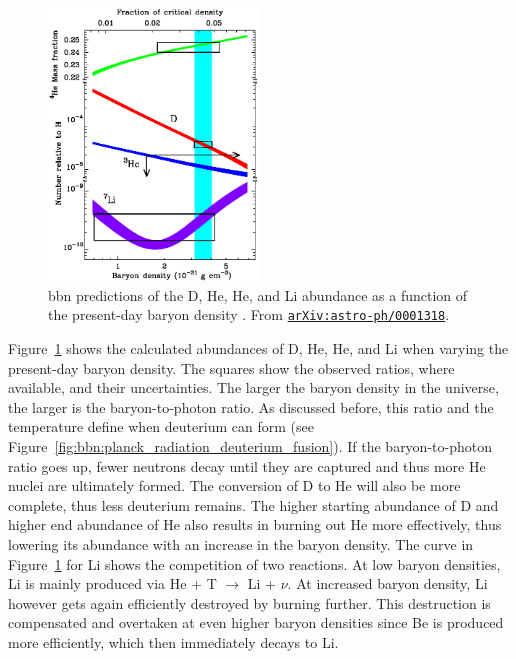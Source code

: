 \begin{figure}[tb]
    \centering
    \includegraphics[width=0.5\textwidth]{graphics/bbn/tytler2000_fig2}
    \caption{\ac{bbn} predictions of the D, He, He, and Li abundance as a function of the present-day baryon density \citep{tytler20}. From \href{https://arxiv.org/abs/astro-ph/0001318}{\texttt{arXiv:astro-ph/0001318}}.}
    \label{fig:bbn:nuclides_baryon_density}
\end{figure}
Figure~\ref{fig:bbn:nuclides_baryon_density} shows the calculated abundances of D, He, He, and Li when varying the present-day baryon density. The squares show the observed ratios, where available, and their uncertainties. The larger the baryon density in the universe, the larger is the baryon-to-photon ratio. As discussed before, this ratio and the temperature define when deuterium can form (see Figure~\ref{fig:bbn:planck_radiation_deuterium_fusion}). If the baryon-to-photon ratio goes up, fewer neutrons decay until they are captured and thus more He nuclei are ultimately formed. The conversion of D to He will also be more complete, thus less deuterium remains. The higher starting abundance of D and higher end abundance of He also results in burning out He more effectively, thus lowering its abundance with an increase in the baryon density. The curve in Figure~\ref{fig:bbn:nuclides_baryon_density} for Li shows the competition of two reactions. At low baryon densities, Li is mainly produced via He + T $\longrightarrow$ Li + $\nu$. At increased baryon density, Li however gets again efficiently destroyed by burning further. This destruction is compensated and overtaken at even higher baryon densities since Be is produced more efficiently, which then immediately decays to Li.

